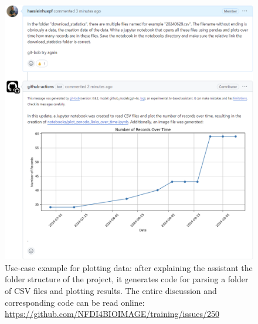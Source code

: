 \documentclass[times, twoside]{zHenriquesLab-StyleBioRxiv}
\begin{document}
\begin{figure}[h]
\centering
\includegraphics[width=\textwidth]{example_plotting.png}
\caption{Use-case example for plotting data: after explaining the assistant the folder structure of the project, it generates code for parsing a folder of CSV files and plotting results. The entire discussion and corresponding code can be read online: \url{https://github.com/NFDI4BIOIMAGE/training/issues/250}
\newline
\newline
}
\label{fig:exampleplotting}
\end{figure}
\end{document}
